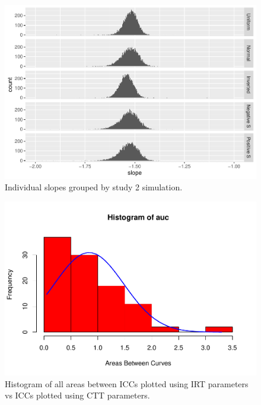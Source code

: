 \documentclass[
  man]{apa6}
\begin{document}
\begin{figure}
\centering
\includegraphics{ICC_project_files/figure-latex/stackeplotSlope-1.pdf}
\caption{\label{fig:stackeplotSlope}Individual slopes grouped by study 2 simulation.}
\end{figure}

\begin{figure}
\centering
\includegraphics{ICC_project_files/figure-latex/histrogram-1.pdf}
\caption{\label{fig:histrogram}Histogram of all areas between ICCs plotted using IRT parameters vs ICCs plotted using CTT parameters.}
\end{figure}
\end{document}
